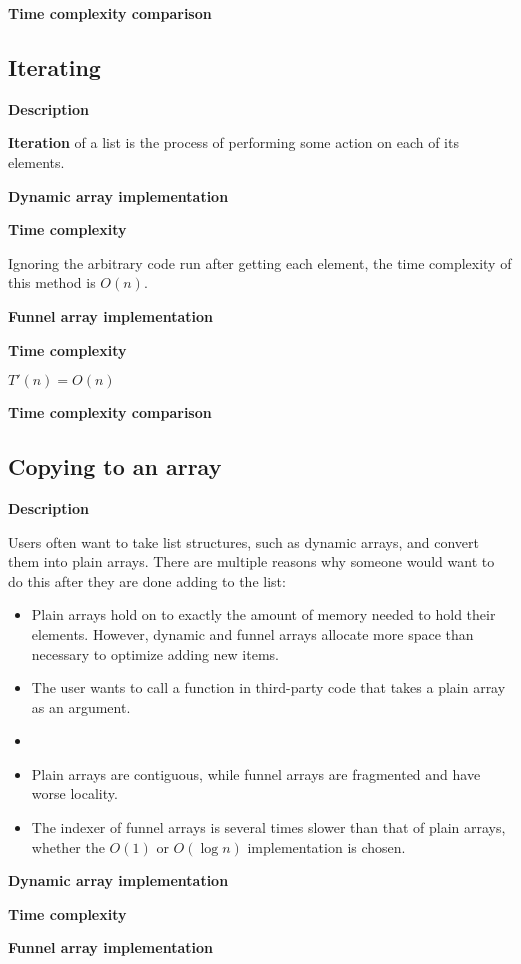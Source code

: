 \documentclass{article}
\newcommand{\descriptn}{\textbf{Description}}
\newcommand{\dynarrayimpl}{\textbf{Dynamic array implementation}}
\newcommand{\funarrayimpl}{\textbf{Funnel array implementation}}
\newcommand{\tcomplex}{\textbf{Time complexity}}
\newcommand{\tcomplexcmp}{\textbf{Time complexity comparison}}
\newcommand{\timefn}{T}
\newcommand{\timenewfn}{\timefn'}
\newcommand{\bigo}{O}
\newcommand{\varnitems}{n}
\begin{document}
	\tcomplexcmp
	
	\subsection{Iterating}
	
	\descriptn
	
	\textbf{Iteration} of a list is the process of performing some action on each of its elements.
	
	\dynarrayimpl
	
	\tcomplex
	
	Ignoring the arbitrary code run after getting each element, the time complexity of this method is $\bigo(\varnitems)$.
	
	\funarrayimpl
	
	\tcomplex
	
	$\timenewfn(\varnitems) = \bigo(\varnitems)$
	
	\tcomplexcmp
	
	\subsection{Copying to an array}
	
	\descriptn
	
	Users often want to take list structures, such as dynamic arrays, and convert them into plain arrays. There are multiple reasons why someone would want to do this after they are done adding to the list:
	
	\begin{itemize}
		\item Plain arrays hold on to exactly the amount of memory needed to hold their elements. However, dynamic and funnel arrays allocate more space than necessary to optimize adding new items.
		\item The user wants to call a function in third-party code that takes a plain array as an argument.
		\item
		\item Plain arrays are contiguous, while funnel arrays are fragmented and have worse locality.
		\item The indexer of funnel arrays is several times slower than that of plain arrays, whether the $\bigo(1)$ or $\bigo(\log \varnitems)$ implementation is chosen.
	\end{itemize}
	
	\dynarrayimpl
	
	\tcomplex
	
	\funarrayimpl
	
\end{document}
